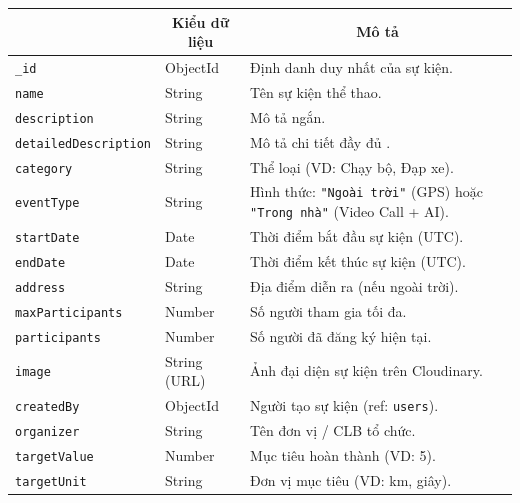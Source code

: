 \begin{table}[H]
\centering
\footnotesize
\setlength{\tabcolsep}{5pt}
\renewcommand{\arraystretch}{1.15}
\begin{tabularx}{\textwidth}{|p{3.8cm}|p{2.6cm}|X|}
\hline
\rowcolor{dbheadblue}
\multicolumn{1}{|c|}{\color{white}\textbf{Trường}} &
\multicolumn{1}{c|}{\color{white}\textbf{Kiểu dữ liệu}} &
\multicolumn{1}{c|}{\color{white}\textbf{Mô tả}} \\
\hline
\texttt{\_id}              & ObjectId        & Định danh duy nhất của sự kiện. \\ \hline
\rowcolor{dbrowalt}
\texttt{name}             & String          & Tên sự kiện thể thao. \\ \hline
\texttt{description}      & String          & Mô tả ngắn. \\ \hline
\rowcolor{dbrowalt}
\texttt{detailedDescription} & String        & Mô tả chi tiết đầy đủ . \\ \hline
\texttt{category}         & String          & Thể loại (VD: Chạy bộ, Đạp xe). \\ \hline
\rowcolor{dbrowalt}
\texttt{eventType}        & String          & Hình thức: \texttt{"Ngoài trời"} (GPS) hoặc \texttt{"Trong nhà"} (Video Call + AI). \\ \hline
\texttt{startDate}        & Date            & Thời điểm bắt đầu sự kiện (UTC). \\ \hline
\rowcolor{dbrowalt}
\texttt{endDate}          & Date            & Thời điểm kết thúc sự kiện (UTC). \\ \hline
\texttt{address}          & String          & Địa điểm diễn ra (nếu ngoài trời). \\ \hline
\rowcolor{dbrowalt}
\texttt{maxParticipants}  & Number          & Số người tham gia tối đa. \\ \hline
\texttt{participants}     & Number          & Số người đã đăng ký hiện tại. \\ \hline
\rowcolor{dbrowalt}
\texttt{image}            & String (URL)    & Ảnh đại diện sự kiện trên Cloudinary. \\ \hline
\texttt{createdBy}        & ObjectId        & Người tạo sự kiện (ref: \texttt{users}). \\ \hline
\rowcolor{dbrowalt}
\texttt{organizer}        & String          & Tên đơn vị / CLB tổ chức. \\ \hline
\texttt{targetValue}      & Number          & Mục tiêu hoàn thành (VD: 5). \\ \hline
\rowcolor{dbrowalt}
\texttt{targetUnit}       & String          & Đơn vị mục tiêu (VD: km, giây). \\ \hline

\end{tabularx}
\end{table}
